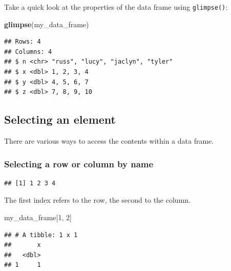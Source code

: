 \documentclass[
  12pt,
]{book}
\newenvironment{Shaded}{\begin{snugshade}}{\end{snugshade}}
\newcommand{\DecValTok}[1]{\textcolor[rgb]{0.00,0.00,0.81}{#1}}
\newcommand{\FunctionTok}[1]{\textcolor[rgb]{0.13,0.29,0.53}{\textbf{#1}}}
\newcommand{\NormalTok}[1]{#1}
\newcommand{\SpecialCharTok}[1]{\textcolor[rgb]{0.81,0.36,0.00}{\textbf{#1}}}
\begin{document}
Take a quick look at the properties of the data frame using \texttt{glimpse()}:

\begin{Shaded}
\begin{Highlighting}[]
\FunctionTok{glimpse}\NormalTok{(my\_data\_frame) }
\end{Highlighting}
\end{Shaded}

\begin{verbatim}
## Rows: 4
## Columns: 4
## $ n <chr> "russ", "lucy", "jaclyn", "tyler"
## $ x <dbl> 1, 2, 3, 4
## $ y <dbl> 4, 5, 6, 7
## $ z <dbl> 7, 8, 9, 10
\end{verbatim}

\hypertarget{selecting-an-element}{%
\subsection{Selecting an element}\label{selecting-an-element}}

There are various ways to access the contents within a data frame.

\hypertarget{selecting-a-row-or-column-by-name}{%
\subsubsection{Selecting a row or column by name}\label{selecting-a-row-or-column-by-name}}

\begin{Shaded}
\end{Shaded}

\begin{verbatim}
## [1] 1 2 3 4
\end{verbatim}

The first index refers to the row, the second to the column.

\begin{Shaded}
\begin{Highlighting}[]
\NormalTok{my\_data\_frame[}\DecValTok{1}\NormalTok{, }\DecValTok{2}\NormalTok{]}
\end{Highlighting}
\end{Shaded}

\begin{verbatim}
## # A tibble: 1 x 1
##       x
##   <dbl>
## 1     1
\end{verbatim}
\end{document}
